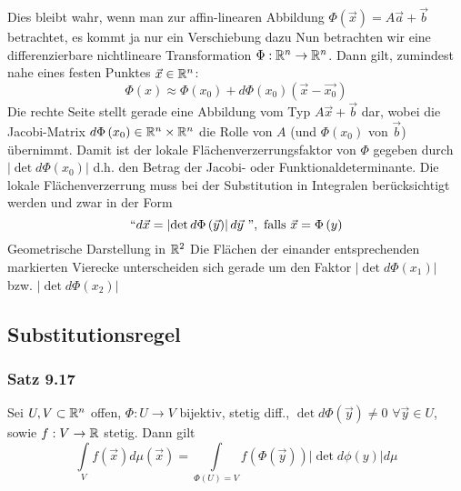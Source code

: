 Dies bleibt wahr, wenn man zur affin-linearen Abbildung $\Phi\left(\vec{x}\right)=A\vec a+\vec b$ betrachtet, es kommt ja nur ein Verschiebung dazu
Nun betrachten wir eine differenzierbare nichtlineare Transformation $\Phi:\mathbb{R}^n \to\mathbb{R}^n$. Dann gilt, zumindest nahe eines festen Punktes $\vec x\in\mathbb{R}^n$:
\[ \Phi\left( x\right)\approx\Phi\left( x_0\right) + d\Phi\left( x_0\right) \left( \vec{x}-\vec{x_0}\right)\]
Die rechte Seite stellt gerade eine Abbildung vom Typ $A\vec x+\vec b$ dar, wobei die Jacobi-Matrix $d\Phi\left( x_0\right)\in\mathbb{R}^n\times\mathbb{R}^n$ die Rolle von $A$ (und $\Phi\left( x_0\right)$ von $\vec b$) übernimmt. Damit ist der lokale Flächenverzerrungsfaktor von $\Phi$ gegeben durch $\left| \det d\Phi\left( x_0\right)\right|$ d.h. den Betrag der Jacobi- oder Funktionaldeterminante. Die lokale Flächenverzerrung muss bei der Substitution in Integralen berücksichtigt werden und zwar in der Form
\[``d\vec x = \left| {\det d\Phi \left( {\vec y} \right)} \right|d\vec{y} \text{ ''},{\text{ falls }}\vec x = \Phi \left( y \right)\]
Geometrische Darstellung in $\mathbb{R}^2$
Die Flächen der einander entsprechenden markierten Vierecke unterscheiden sich gerade um den Faktor $\left|\det d\Phi\left( x_1\right)\right|$ bzw. $\left|\det d\Phi\left( x_2\right)\right|$
\subsection*{Substitutionsregel}
\subsubsection*{Satz 9.17}
Sei $U,V\subset\mathbb{R}^n$ offen, $\Phi:U\to V$ bijektiv, stetig diff., $\det d\Phi\left( \vec y\right)\not=0$ $\forall\vec y\in U$, sowie $f: V\to\mathbb{R}$ stetig. Dann gilt
\[\int\limits_V {f\left( {\vec x} \right)d\mu \left( {\vec x} \right)}  = \int\limits_{\Phi \left( U \right) = V} {f\left( {\Phi \left( {\vec y} \right)} \right)\left| {\det d\phi \left( y \right)} \right|} d\mu \]

